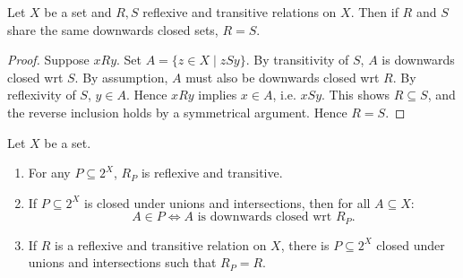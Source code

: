 \begin{lemma}
\label{exp_lemma_same_dc_sets_implies_equality}
    Let $X$ be a set and $R, S$ reflexive and transitive relations on $X$. Then
    if $R$ and $S$ share the same downwards closed sets, $R = S$.
\end{lemma}
\begin{proof}
    Suppose $xRy$. Set $A = \{z \in X \mid zSy\}$. By transitivity of $S$, $A$
    is downwards closed wrt $S$.  By assumption, $A$ must also be downwards
    closed wrt $R$. By reflexivity of $S$, $y \in A$. Hence $xRy$ implies $x
    \in A$, i.e. $xSy$. This shows $R \subseteq S$, and the reverse inclusion
    holds by a symmetrical argument. Hence $R = S$.
\end{proof}

\begin{lemma}
\label{exp_lemma_p_to_rp_mapping}
    Let $X$ be a set.

    \begin{enumerate}
        \item\label{exp_item_rp_ref_and_tr} For any $P \subseteq 2^X$, $R_P$ is
            reflexive and transitive.

        \item\label{exp_item_rp_dc_property} If $P \subseteq 2^X$ is closed under
             unions and intersections, then for all $A \subseteq X$:
            \[
                A \in P \iff A \text{ is downwards closed wrt } R_P.
            \]

        \item\label{exp_item_rp_surjectivity} If $R$ is a reflexive and transitive
            relation on $X$, there is $P \subseteq 2^X$ closed under unions and
            intersections such that $R_P = R$.
    \end{enumerate}
\end{lemma}

